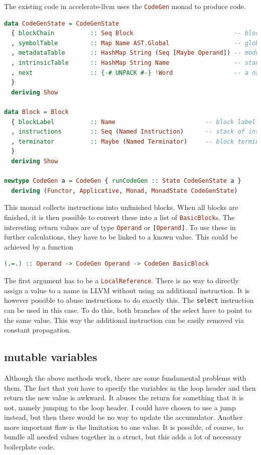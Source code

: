 \documentclass[a4paper,bibliography=totocnumbered,parskip,headsepline]{scrbook}
\begin{document}
The existing code in accelerate-llvm uses the \lstinline[language=haskell]!CodeGen! monad to produce code.
\begin{lstlisting}[language=haskell]
data CodeGenState = CodeGenState
  { blockChain          :: Seq Block                            -- blocks for this function
  , symbolTable         :: Map Name AST.Global                  -- global (external) function declarations
  , metadataTable       :: HashMap String (Seq [Maybe Operand]) -- module metadata to be collected
  , intrinsicTable      :: HashMap String Name                  -- standard math intrinsic functions
  , next                :: {-# UNPACK #-} !Word                 -- a name supply
  }
  deriving Show

data Block = Block
  { blockLabel          :: Name                         -- block label
  , instructions        :: Seq (Named Instruction)      -- stack of instructions
  , terminator          :: Maybe (Named Terminator)     -- block terminator
  }
  deriving Show

newtype CodeGen a = CodeGen { runCodeGen :: State CodeGenState a }
  deriving (Functor, Applicative, Monad, MonadState CodeGenState)
\end{lstlisting}

This monad collects instructions into unfinished blocks.
When all blocks are finished, it is then possible to convert these into a list of \lstinline[language=haskell]!BasicBlock!s.
The interesting return values are of type \lstinline[language=haskell]!Operand! or \lstinline[language=haskell]![Operand]!.
To use these in further calculations, they have to be linked to a known value.
This could be achieved by a function
\begin{lstlisting}[language=haskell]
(.=.) :: Operand -> CodeGen Operand -> CodeGen BasicBlock
\end{lstlisting}
The first argument has to be a \lstinline[language=haskell]!LocalReference!.
There is no way to directly assign a value to a name in LLVM without using an additional instruction.
It is however possible to abuse instructions to do exactly this.
The \lstinline!select! instruction can be used in this case.
To do this, both branches of the select have to point to the same value.
This way the additional instruction can be easily removed via constant propagation.



\subsection{mutable variables}
Although the above methods work, there are some fundamental problems with them.
The fact that you have to specify the variables in the loop header and then return the new value is awkward.
It abuses the return for something that it is not, namely jumping to the loop header.
I could have chosen to use a jump instead, but then there would be no way to update the accumulator.
Another more important flaw is the limitation to one value.
It is possible, of course, to bundle all needed values together in a struct, but this adds a lot of necessary boilerplate code.
\end{document}
